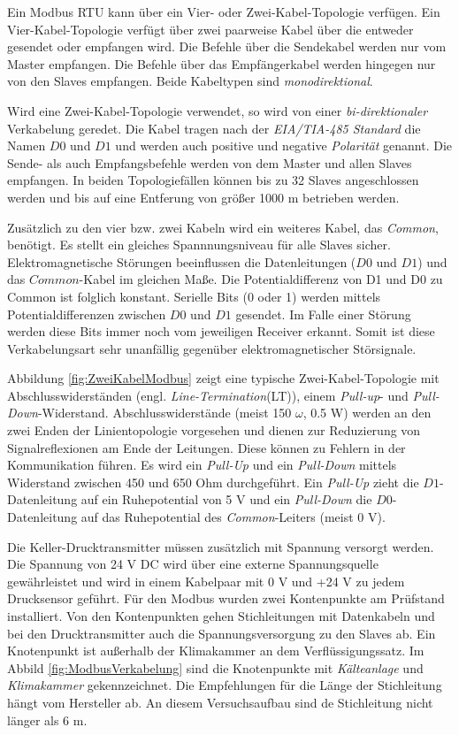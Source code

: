 Ein Modbus RTU kann über ein Vier- oder Zwei-Kabel-Topologie verfügen. Ein Vier-Kabel-Topologie verfügt über zwei paarweise Kabel über die entweder gesendet oder empfangen wird. Die Befehle über die Sendekabel werden nur vom Master empfangen. Die Befehle über das Empfängerkabel werden hingegen nur von den Slaves empfangen. Beide Kabeltypen sind \textit{monodirektional}.
 
Wird eine Zwei-Kabel-Topologie verwendet, so wird von einer \textit{bi-direktionaler} Verkabelung geredet. Die Kabel tragen nach der \textit{EIA/TIA-485 Standard} die Namen $D0$ und $D1$ und werden auch positive und negative \textit{Polarität} genannt. Die Sende- als auch Empfangsbefehle werden von dem Master und allen Slaves empfangen. In beiden Topologiefällen können bis zu 32 Slaves angeschlossen werden und bis auf eine Entferung von größer 1000 m betrieben werden. 
 
Zusätzlich zu den vier bzw. zwei Kabeln wird ein weiteres Kabel, das \textit{Common}, benötigt. Es stellt ein gleiches Spannnungsniveau für alle Slaves sicher. Elektromagnetische Störungen beeinflussen die Datenleitungen ($D0$ und $D1$) und das $Common$-Kabel im gleichen Maße. Die Potentialdifferenz von D1 und D0 zu Common ist folglich konstant. Serielle Bits (0 oder 1) werden mittels Potentialdifferenzen zwischen $D0$ und $D1$ gesendet. Im Falle einer Störung werden diese Bits immer noch vom jeweiligen Receiver erkannt. Somit ist diese Verkabelungsart sehr unanfällig gegenüber elektromagnetischer Störsignale. 


Abbildung \ref{fig:ZweiKabelModbus} zeigt eine typische Zwei-Kabel-Topologie mit Abschlusswiderständen (engl. \textit{Line-Termination}(LT)), einem \textit{Pull-up}- und \textit{Pull-Down}-Widerstand.  Abschlusswiderstände (meist 150 $\omega$, 0.5 W) werden an den zwei Enden der Linientopologie vorgesehen und dienen zur Reduzierung von Signalreflexionen am Ende der Leitungen. Diese können zu Fehlern in der Kommunikation führen. 
Es wird ein \textit{Pull-Up} und ein \textit{Pull-Down} mittels Widerstand zwischen 450 und 650 Ohm durchgeführt. Ein \textit{Pull-Up} zieht die $D1$-Datenleitung auf ein Ruhepotential von 5 V und ein \textit{Pull-Down} die $D0$-Datenleitung auf das Ruhepotential des \textit{Common}-Leiters (meist 0 V).

Die Keller-Drucktransmitter müssen zusätzlich mit Spannung versorgt werden. Die Spannung von 24 V DC wird über eine externe Spannungsquelle gewährleistet und wird in einem Kabelpaar mit 0 V und +24 V zu jedem Drucksensor geführt. Für den Modbus wurden zwei Kontenpunkte am Prüfstand installiert. Von den Kontenpunkten gehen Stichleitungen mit Datenkabeln und bei den Drucktransmitter auch die Spannungsversorgung zu den Slaves ab. Ein Knotenpunkt ist außerhalb der Klimakammer an dem Verflüssigungssatz. Im Abbild \ref{fig:ModbusVerkabelung} sind die Knotenpunkte mit \textit{Kälteanlage} und \textit{Klimakammer} gekennzeichnet. Die Empfehlungen für die Länge der Stichleitung hängt vom Hersteller ab. An diesem Versuchsaufbau sind de Stichleitung nicht länger als 6 m. 

